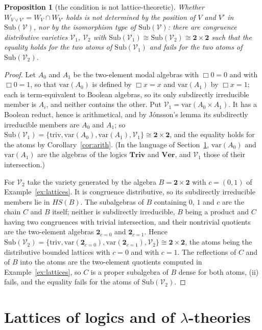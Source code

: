 \documentclass[11pt]{amsart}
\newtheorem{prop}[thm]{Proposition}
\theoremstyle{definition}
\newcommand{\Sub}{\mathrm{Sub}}
\newcommand{\sV}{\mathcal V}
\newcommand{\var}{\mathrm{var}}
\begin{document}
\begin{prop}[the condition is not lattice-theoretic]\label{prop:notlattice}
Whether $W_{V\vee V'}=W_V\cap W_{V'}$ holds is not determined by the
position of $V$ and $V'$ in $\Sub(\sV)$, nor by the isomorphism type of
$\Sub(\sV)$: there are congruence distributive varieties $\sV_1$, $\sV_2$ with
$\Sub(\sV_1)\cong\Sub(\sV_2)\cong\mathbf 2\times\mathbf 2$ such that the
equality holds for the two atoms of $\Sub(\sV_1)$ and fails for the two atoms
of $\Sub(\sV_2)$.
\end{prop}
\begin{proof}
Let $A_0$ and $A_1$ be the two-element modal algebras with $\Box0=0$ and with
$\Box0=1$, so that $\var(A_0)$ is defined by $\Box x=x$ and $\var(A_1)$ by
$\Box x=1$; each is term-equivalent to Boolean algebras, so its only
subdirectly irreducible member is $A_i$, and neither contains the other. Put
$\sV_1=\var(A_0\times A_1)$. It has a Boolean reduct, hence is arithmetical,
and by Jónsson's lemma its subdirectly irreducible members are $A_0$ and
$A_1$; so $\Sub(\sV_1)=\{\mathrm{triv},\var(A_0),\var(A_1),\sV_1\}\cong
\mathbf 2\times\mathbf 2$, and the equality holds for the atoms by
Corollary~\ref{cor:arith}. (In the language of Section~\ref{sec:logic},
$\var(A_0)$ and $\var(A_1)$ are the algebras of the logics $\mathbf{Triv}$ and
$\mathbf{Ver}$, and $\sV_1$ those of their intersection.)

For $\sV_2$ take the variety generated by the algebra $B=\mathbf 2\times\mathbf 2$
with $c=(0,1)$ of Example~\ref{ex:lattices}. It is congruence distributive,
so its subdirectly irreducible members lie in $HS(B)$. The subalgebras of $B$
containing $0$, $1$ and $c$ are the chain $C$ and $B$ itself; neither is
subdirectly irreducible, $B$ being a product and $C$ having two congruences
with trivial intersection, and their nontrivial quotients are the two-element
algebras $\mathbf 2_{c=0}$ and $\mathbf 2_{c=1}$. Hence
$\Sub(\sV_2)=\{\mathrm{triv},\var(\mathbf 2_{c=0}),\var(\mathbf 2_{c=1}),\sV_2\}
\cong\mathbf 2\times\mathbf 2$, the atoms being the distributive bounded
lattices with $c=0$ and with $c=1$. The reflections of $C$ and of $B$ into
the atoms are the two-element quotients computed in
Example~\ref{ex:lattices}, so $C$ is a proper subalgebra of $B$ dense for
both atoms, (ii) fails, and the equality fails for the atoms of $\Sub(\sV_2)$.
\end{proof}


\section{Lattices of logics and of $\lambda$-theories}\label{sec:logic}
\end{document}
